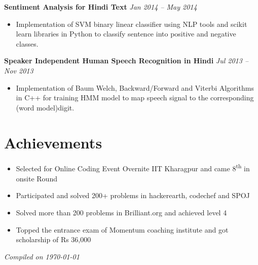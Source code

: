 \documentclass[margin,line]{resume}
\begin{document}
\begin{resume}
    \textbf{Sentiment Analysis for Hindi Text} \hfill \textsl{Jan 2014 -- May 2014} \vspace{0mm}\\\vspace{0mm}%
       \begin{itemize} 
            \item Implementation of SVM binary linear classifier using NLP tools and scikit learn libraries in Python to classify sentence into positive and negative classes.
       \end{itemize}


    \textbf{Speaker Independent Human Speech Recognition in Hindi} \hfill \textsl{Jul 2013 -- Nov 2013} \vspace{0mm}\\\vspace{0mm}%
       \begin{itemize}
            \item Implementation of Baum Welch, Backward/Forward and Viterbi Algorithms in C++ for training HMM model to map speech signal to the corresponding (word model)digit.
       \end{itemize}


    \section{\mysidestyle Achievements}
    \begin{itemize}
	        \item Selected for Online Coding Event Overnite IIT Kharagpur and came 8​\textsuperscript{th}​ in onsite Round
	        \item Participated and solved 200+ problems in hackerearth, codechef and SPOJ
	        \item Solved more than 200 problems in Brilliant.org and achieved level 4
	        \item Topped the entrance exam of Momentum coaching institute and got scholarship of Rs 36,000
   \end{itemize}

\hfill \textsl{Compiled on \monthyeardate\today}

\end{resume}
\end{document}
